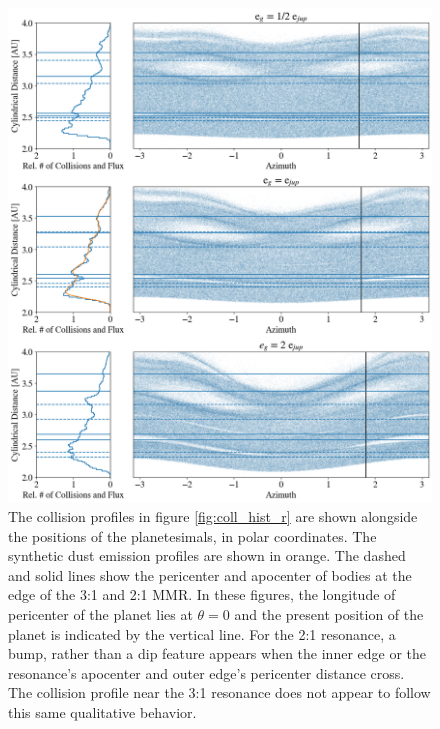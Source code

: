 \documentclass[twocolumn]{aastex63}
\begin{document}
\begin{figure}
    \includegraphics[width=\textwidth]{figures/coll_polar_e.png}
    \caption{The collision profiles in figure \ref{fig:coll_hist_r} are shown alongside the positions of the planetesimals, in polar coordinates. The 
    synthetic dust emission profiles are shown in orange. The dashed and solid lines show the pericenter and apocenter of bodies at the edge of the 
    3:1 and 2:1 MMR. In these figures, the longitude of pericenter of the planet lies at $\theta = 0$ and the present position of the planet is indicated 
    by the vertical line. For the 2:1 resonance, a bump, rather than a dip feature appears when the inner edge or the resonance's apocenter and outer 
    edge's pericenter distance cross. The collision profile near the 3:1 resonance does not appear to follow this same qualitative behavior.
    \label{fig:coll_polar_e}}
\end{figure}
\end{document}

